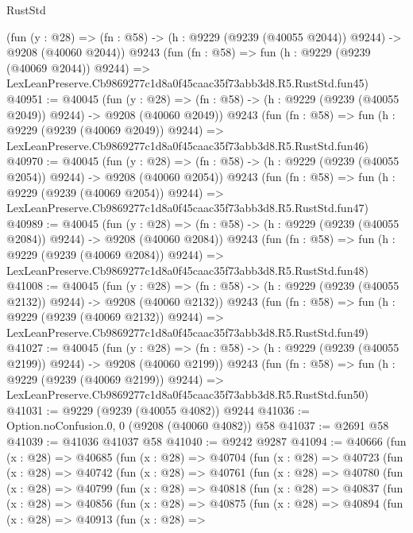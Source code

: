 \begin{lexlean}{RustStd}
\begin{coremodule}
    (fun (y : @28) =>
    (fn : @58) -> (h : @9229 (@9239 (@40055 @2044)) @9244) -> @9208 (@40060 @2044))
    @9243
    (fun (fn : @58) =>
    fun (h : @9229 (@9239 (@40069 @2044)) @9244) =>
    LexLeanPreserve.Cb9869277c1d8a0f45caac35f73abb3d8.R5.RustStd.fun45)
@40951 := @40045
    (fun (y : @28) =>
    (fn : @58) -> (h : @9229 (@9239 (@40055 @2049)) @9244) -> @9208 (@40060 @2049))
    @9243
    (fun (fn : @58) =>
    fun (h : @9229 (@9239 (@40069 @2049)) @9244) =>
    LexLeanPreserve.Cb9869277c1d8a0f45caac35f73abb3d8.R5.RustStd.fun46)
@40970 := @40045
    (fun (y : @28) =>
    (fn : @58) -> (h : @9229 (@9239 (@40055 @2054)) @9244) -> @9208 (@40060 @2054))
    @9243
    (fun (fn : @58) =>
    fun (h : @9229 (@9239 (@40069 @2054)) @9244) =>
    LexLeanPreserve.Cb9869277c1d8a0f45caac35f73abb3d8.R5.RustStd.fun47)
@40989 := @40045
    (fun (y : @28) =>
    (fn : @58) -> (h : @9229 (@9239 (@40055 @2084)) @9244) -> @9208 (@40060 @2084))
    @9243
    (fun (fn : @58) =>
    fun (h : @9229 (@9239 (@40069 @2084)) @9244) =>
    LexLeanPreserve.Cb9869277c1d8a0f45caac35f73abb3d8.R5.RustStd.fun48)
@41008 := @40045
    (fun (y : @28) =>
    (fn : @58) -> (h : @9229 (@9239 (@40055 @2132)) @9244) -> @9208 (@40060 @2132))
    @9243
    (fun (fn : @58) =>
    fun (h : @9229 (@9239 (@40069 @2132)) @9244) =>
    LexLeanPreserve.Cb9869277c1d8a0f45caac35f73abb3d8.R5.RustStd.fun49)
@41027 := @40045
    (fun (y : @28) =>
    (fn : @58) -> (h : @9229 (@9239 (@40055 @2199)) @9244) -> @9208 (@40060 @2199))
    @9243
    (fun (fn : @58) =>
    fun (h : @9229 (@9239 (@40069 @2199)) @9244) =>
    LexLeanPreserve.Cb9869277c1d8a0f45caac35f73abb3d8.R5.RustStd.fun50)
@41031 := @9229 (@9239 (@40055 @4082)) @9244
@41036 := Option.noConfusion.{0, 0} (@9208 (@40060 @4082)) @58
@41037 := @2691 @58
@41039 := @41036 @41037 @58
@41040 := @9242 @9287
@41094 := @40666
    (fun (x : @28) =>
    @40685
      (fun (x : @28) =>
      @40704
        (fun (x : @28) =>
        @40723
          (fun (x : @28) =>
          @40742
            (fun (x : @28) =>
            @40761
              (fun (x : @28) =>
              @40780
                (fun (x : @28) =>
                @40799
                  (fun (x : @28) =>
                  @40818
                    (fun (x : @28) =>
                    @40837
                      (fun (x : @28) =>
                      @40856
                        (fun (x : @28) =>
                        @40875
                          (fun (x : @28) =>
                          @40894
                            (fun (x : @28) =>
                            @40913
                              (fun (x : @28) =>

\end{coremodule}
\end{lexlean}
